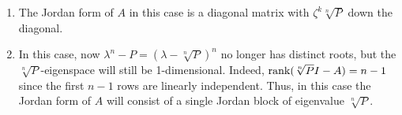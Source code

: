 \begin{solution}
\begin{enumerate}
    By ``find the eigenspaces'', I assume they mean write down eigenvectors corresponding to each eigenvalue. That seems a bit mean, because the eigenvectors don't look particularly nice. Here's the cleanest way I found to write them. Reckon all indices cyclically, so $n+1$ means the same thing as 1. Let $v$ be the vector whose $i$th component is
    \[v_i = \zeta^{-ik} \sqrt[n]{\prod_{j=1}^{n-1} a_{i+j}^j} = \zeta^{-ik} \sqrt[n]{a_{i+1} a_{i+2}^2 \cdots a_{i-1}^{n-1}}.\]
    Then the $i$th component of $Av$ is
    \begin{align*}
        a_{i-1} v_{i-1} &= a_{i-1} \cdot \zeta^{-(i-1)k} \sqrt[n]{a_i a_{i+1}^2 \cdots a_{i-2}^{n-1}}\\
        &= \zeta^{-(i-1)k} \sqrt[n]{a_i a_{i+1}^2 \cdots a_{i-2}^{n-1} a_{i-1}^n} \\
        &= \zeta^k \sqrt[n]{a_i a_{i+1} \cdots a_{i-1}} \paren{\zeta^{-ik} \sqrt[n]{a_{i+1} a_{i+2}^2 \cdots a_{i-1}^{n-1}}} \\
        &= \zeta^k \sqrt[n]{P} v_i,
    \end{align*}
    so $v$ is an eigenvector of eigenvalue $\zeta^k \sqrt[n]{P}$.
    \item The Jordan form of $A$ in this case is a diagonal matrix with $\zeta^k \sqrt[n]{P}$ down the diagonal.
    \item In this case, now $\lambda^n - P = (\lambda - \sqrt[n]{P})^n$ no longer has distinct roots, but the $\sqrt[n]{P}$-eigenspace will still be 1-dimensional. Indeed, $\operatorname{rank}(\sqrt[n]{P}I - A) = n-1$ since the first $n-1$ rows are linearly independent. Thus, in this case the Jordan form of $A$ will consist of a single Jordan block of eigenvalue $\sqrt[n]{P}$.
\end{enumerate}
\end{solution}

